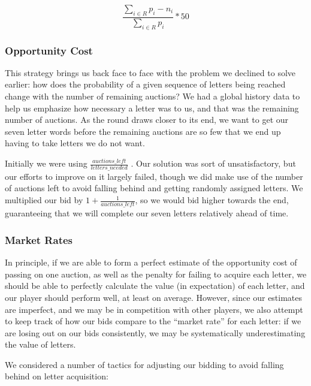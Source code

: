 \documentclass[11pt]{article}
\begin{document}
$$\frac{\sum_{i \in R}p_i - n_i}{\sum_{i \in R}p_i} * 50$$

\subsubsection{Opportunity Cost}

This strategy brings us back face to face with the problem we declined to solve earlier: how does the probability of a given sequence of letters being reached change with the number of remaining auctions? We had a global history data to help us emphasize how necessary a letter was to us, and that was the remaining number of auctions. As the round draws closer to its end, we want to get our seven letter words before the remaining auctions are so few that we end up having to take letters we do not want. 

Initially we were using $\frac{auctions\_left}{letters\_needed}$ . Our solution was sort of unsatisfactory, but our efforts to improve on it largely failed, though we did make use of the number of auctions left to avoid falling behind and getting randomly assigned letters. We multiplied our bid by $1+\frac{1}{auctions\_left}$, so we would bid higher towards the end, guaranteeing that we will complete our seven letters relatively ahead of time.

\subsubsection{Market Rates}

In principle, if we are able to form a perfect estimate of the opportunity cost of passing on one auction, as well as the penalty for failing to acquire each letter, we should be able to perfectly calculate the value (in expectation) of each letter, and our player should perform well, at least on average.  However, since our estimates are imperfect, and we may be in competition with other players, we also attempt to keep track of how our bids compare to the ``market rate'' for each letter: if we are losing out on our bids consistently, we may be systematically underestimating the value of letters.

We considered a number of tactics for adjusting our bidding to avoid falling behind on letter acquisition:
\end{document}
